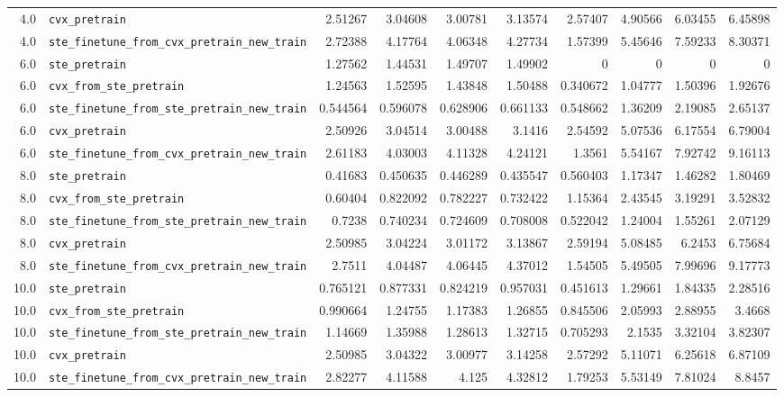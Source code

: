 \begin{longtable}{@{}r l *{8}{r}@{}}
4.0 & \texttt{cvx\_pretrain} & 2.51267 & 3.04608 & 3.00781 & 3.13574 & 2.57407 & 4.90566 & 6.03455 & 6.45898 \\
4.0 & \texttt{ste\_finetune\_from\_cvx\_pretrain\_new\_train} & 2.72388 & 4.17764 & 4.06348 & 4.27734 & 1.57399 & 5.45646 & 7.59233 & 8.30371 \\
6.0 & \texttt{ste\_pretrain} & 1.27562 & 1.44531 & 1.49707 & 1.49902 & 0 & 0 & 0 & 0 \\
6.0 & \texttt{cvx\_from\_ste\_pretrain} & 1.24563 & 1.52595 & 1.43848 & 1.50488 & 0.340672 & 1.04777 & 1.50396 & 1.92676 \\
6.0 & \texttt{ste\_finetune\_from\_ste\_pretrain\_new\_train} & 0.544564 & 0.596078 & 0.628906 & 0.661133 & 0.548662 & 1.36209 & 2.19085 & 2.65137 \\
6.0 & \texttt{cvx\_pretrain} & 2.50926 & 3.04514 & 3.00488 & 3.1416 & 2.54592 & 5.07536 & 6.17554 & 6.79004 \\
6.0 & \texttt{ste\_finetune\_from\_cvx\_pretrain\_new\_train} & 2.61183 & 4.03003 & 4.11328 & 4.24121 & 1.3561 & 5.54167 & 7.92742 & 9.16113 \\
8.0 & \texttt{ste\_pretrain} & 0.41683 & 0.450635 & 0.446289 & 0.435547 & 0.560403 & 1.17347 & 1.46282 & 1.80469 \\
8.0 & \texttt{cvx\_from\_ste\_pretrain} & 0.60404 & 0.822092 & 0.782227 & 0.732422 & 1.15364 & 2.43545 & 3.19291 & 3.52832 \\
8.0 & \texttt{ste\_finetune\_from\_ste\_pretrain\_new\_train} & 0.7238 & 0.740234 & 0.724609 & 0.708008 & 0.522042 & 1.24004 & 1.55261 & 2.07129 \\
8.0 & \texttt{cvx\_pretrain} & 2.50985 & 3.04224 & 3.01172 & 3.13867 & 2.59194 & 5.08485 & 6.2453 & 6.75684 \\
8.0 & \texttt{ste\_finetune\_from\_cvx\_pretrain\_new\_train} & 2.7511 & 4.04487 & 4.06445 & 4.37012 & 1.54505 & 5.49505 & 7.99696 & 9.17773 \\
10.0 & \texttt{ste\_pretrain} & 0.765121 & 0.877331 & 0.824219 & 0.957031 & 0.451613 & 1.29661 & 1.84335 & 2.28516 \\
10.0 & \texttt{cvx\_from\_ste\_pretrain} & 0.990664 & 1.24755 & 1.17383 & 1.26855 & 0.845506 & 2.05993 & 2.88955 & 3.4668 \\
10.0 & \texttt{ste\_finetune\_from\_ste\_pretrain\_new\_train} & 1.14669 & 1.35988 & 1.28613 & 1.32715 & 0.705293 & 2.1535 & 3.32104 & 3.82307 \\
10.0 & \texttt{cvx\_pretrain} & 2.50985 & 3.04322 & 3.00977 & 3.14258 & 2.57292 & 5.11071 & 6.25618 & 6.87109 \\
10.0 & \texttt{ste\_finetune\_from\_cvx\_pretrain\_new\_train} & 2.82277 & 4.11588 & 4.125 & 4.32812 & 1.79253 & 5.53149 & 7.81024 & 8.8457 \\
\end{longtable}

